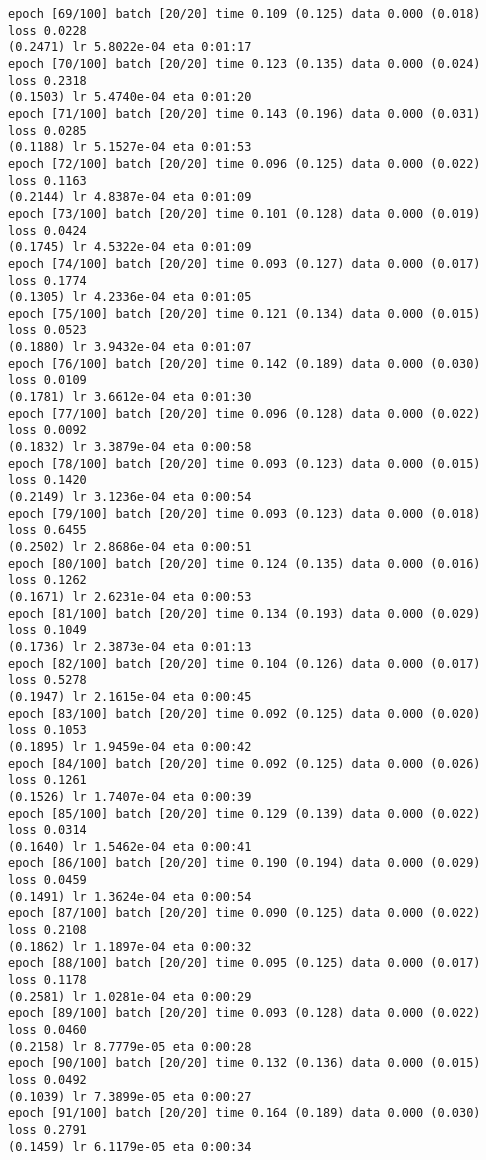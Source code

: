 \documentclass[11pt]{article}
\begin{document}
\begin{Verbatim}[commandchars=\\\{\}]
epoch [69/100] batch [20/20] time 0.109 (0.125) data 0.000 (0.018) loss 0.0228
(0.2471) lr 5.8022e-04 eta 0:01:17
epoch [70/100] batch [20/20] time 0.123 (0.135) data 0.000 (0.024) loss 0.2318
(0.1503) lr 5.4740e-04 eta 0:01:20
epoch [71/100] batch [20/20] time 0.143 (0.196) data 0.000 (0.031) loss 0.0285
(0.1188) lr 5.1527e-04 eta 0:01:53
epoch [72/100] batch [20/20] time 0.096 (0.125) data 0.000 (0.022) loss 0.1163
(0.2144) lr 4.8387e-04 eta 0:01:09
epoch [73/100] batch [20/20] time 0.101 (0.128) data 0.000 (0.019) loss 0.0424
(0.1745) lr 4.5322e-04 eta 0:01:09
epoch [74/100] batch [20/20] time 0.093 (0.127) data 0.000 (0.017) loss 0.1774
(0.1305) lr 4.2336e-04 eta 0:01:05
epoch [75/100] batch [20/20] time 0.121 (0.134) data 0.000 (0.015) loss 0.0523
(0.1880) lr 3.9432e-04 eta 0:01:07
epoch [76/100] batch [20/20] time 0.142 (0.189) data 0.000 (0.030) loss 0.0109
(0.1781) lr 3.6612e-04 eta 0:01:30
epoch [77/100] batch [20/20] time 0.096 (0.128) data 0.000 (0.022) loss 0.0092
(0.1832) lr 3.3879e-04 eta 0:00:58
epoch [78/100] batch [20/20] time 0.093 (0.123) data 0.000 (0.015) loss 0.1420
(0.2149) lr 3.1236e-04 eta 0:00:54
epoch [79/100] batch [20/20] time 0.093 (0.123) data 0.000 (0.018) loss 0.6455
(0.2502) lr 2.8686e-04 eta 0:00:51
epoch [80/100] batch [20/20] time 0.124 (0.135) data 0.000 (0.016) loss 0.1262
(0.1671) lr 2.6231e-04 eta 0:00:53
epoch [81/100] batch [20/20] time 0.134 (0.193) data 0.000 (0.029) loss 0.1049
(0.1736) lr 2.3873e-04 eta 0:01:13
epoch [82/100] batch [20/20] time 0.104 (0.126) data 0.000 (0.017) loss 0.5278
(0.1947) lr 2.1615e-04 eta 0:00:45
epoch [83/100] batch [20/20] time 0.092 (0.125) data 0.000 (0.020) loss 0.1053
(0.1895) lr 1.9459e-04 eta 0:00:42
epoch [84/100] batch [20/20] time 0.092 (0.125) data 0.000 (0.026) loss 0.1261
(0.1526) lr 1.7407e-04 eta 0:00:39
epoch [85/100] batch [20/20] time 0.129 (0.139) data 0.000 (0.022) loss 0.0314
(0.1640) lr 1.5462e-04 eta 0:00:41
epoch [86/100] batch [20/20] time 0.190 (0.194) data 0.000 (0.029) loss 0.0459
(0.1491) lr 1.3624e-04 eta 0:00:54
epoch [87/100] batch [20/20] time 0.090 (0.125) data 0.000 (0.022) loss 0.2108
(0.1862) lr 1.1897e-04 eta 0:00:32
epoch [88/100] batch [20/20] time 0.095 (0.125) data 0.000 (0.017) loss 0.1178
(0.2581) lr 1.0281e-04 eta 0:00:29
epoch [89/100] batch [20/20] time 0.093 (0.128) data 0.000 (0.022) loss 0.0460
(0.2158) lr 8.7779e-05 eta 0:00:28
epoch [90/100] batch [20/20] time 0.132 (0.136) data 0.000 (0.015) loss 0.0492
(0.1039) lr 7.3899e-05 eta 0:00:27
epoch [91/100] batch [20/20] time 0.164 (0.189) data 0.000 (0.030) loss 0.2791
(0.1459) lr 6.1179e-05 eta 0:00:34

\end{Verbatim}
\end{document}
